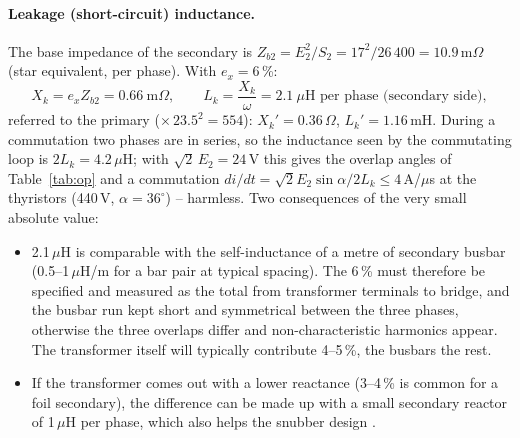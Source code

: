 \documentclass[11pt,a4paper]{article}
\newcommand{\ex}{e_x}
\newcommand{\Ell}{E_{2}}
\begin{document}
\paragraph{Leakage (short-circuit) inductance.} The base impedance of the secondary is $Z_{b2} = \Ell^2/S_2 = 17^2/26\,400 = 10.9$\,m$\Omega$ (star equivalent, per phase). With $\ex = 6$\,\%:
\[
X_k = \ex Z_{b2} = 0.66\ \text{m}\Omega, \qquad L_k = \frac{X_k}{\omega} = 2.1\ \mu\text{H per phase (secondary side)},
\]
referred to the primary ($\times\,23.5^2 = 554$): $X_k' = 0.36$\,$\Omega$, $L_k' = 1.16$\,mH. During a commutation two phases are in series, so the inductance seen by the commutating loop is $2L_k = 4.2$\,$\mu$H; with $\sqrt2\,\Ell = 24$\,V this gives the overlap angles of Table~\ref{tab:op} and a commutation $di/dt = \sqrt2\Ell\sin\alpha/2L_k \le 4$\,A/$\mu$s at the thyristors (440\,V, $\alpha = 36^\circ$) -- harmless. Two consequences of the very small absolute value:
\begin{itemize}
\item 2.1\,$\mu$H is comparable with the self-inductance of a metre of secondary busbar (0.5--1\,$\mu$H/m for a bar pair at typical spacing). The 6\,\% must therefore be specified and measured as the total from transformer terminals to bridge, and the busbar run kept short and symmetrical between the three phases, otherwise the three overlaps differ and non-characteristic harmonics appear. The transformer itself will typically contribute 4--5\,\%, the busbars the rest.
\item If the transformer comes out with a lower reactance (3--4\,\% is common for a foil secondary), the difference can be made up with a small secondary reactor of 1\,$\mu$H per phase, which also helps the snubber design \cite{snubber}.
\end{itemize}
\end{document}
